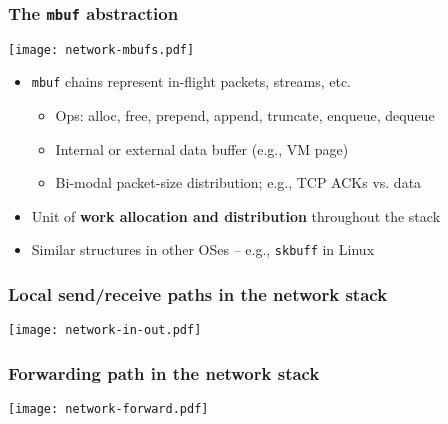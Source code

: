 \begin{frame}
  \frametitle{The \texttt{mbuf} abstraction}

  \begin{center}
    \texttt{[image: network-mbufs.pdf]}
  \end{center}

  \vspace{-0.45cm}
  \pause

  \begin{itemize}
    \item \texttt{mbuf} chains represent in-flight packets, streams, etc.

    \pause

    \begin{itemize}
      \item Ops: alloc, free, prepend, append, truncate, enqueue, dequeue
      \item Internal or external data buffer (e.g., VM page)
      \item Bi-modal packet-size distribution; e.g., TCP ACKs vs. data
    \end{itemize}

    \smallskip
    \pause

    \item Unit of \textbf{work allocation and distribution} throughout the
      stack
    \pause
    \item Similar structures in other OSes -- e.g., \texttt{skbuff} in Linux
  \end{itemize}
\end{frame}

\begin{frame}
  \frametitle{Local send/receive paths in the network stack}
  \begin{center}
    \texttt{[image: network-in-out.pdf]}
  \end{center}
\end{frame}

\begin{frame}
  \frametitle{Forwarding path in the network stack}
  \begin{center}
    \texttt{[image: network-forward.pdf]}
  \end{center}
\end{frame}

